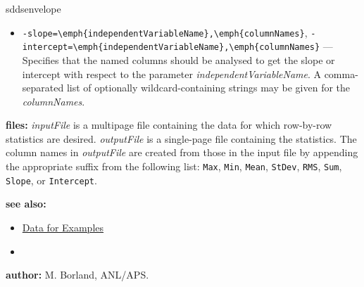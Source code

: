 \begin{sddsprog}{sddsenvelope}
\begin{itemize}
    \item \verb|-slope=\emph{independentVariableName},\emph{columnNames}|, \verb|-intercept=\emph{independentVariableName},\emph{columnNames}| --- Specifies that the named columns should be analysed to get the slope or intercept with respect to the parameter \emph{independentVariableName}. A comma-separated list of optionally wildcard-containing strings may be given for the \emph{columnNames}.
  \end{itemize}
  \item \textbf{files:} \emph{inputFile} is a multipage file containing the data for which row-by-row statistics are desired. \emph{outputFile} is a single-page file containing the statistics. The column names in \emph{outputFile} are created from those in the input file by appending the appropriate suffix from the following list: {\tt Max}, {\tt Min}, {\tt Mean}, {\tt StDev}, {\tt RMS}, {\tt Sum}, {\tt Slope}, or {\tt Intercept}.
  \item \textbf{see also:}
  \begin{itemize}
    \item \hyperref[exampleData]{Data for Examples}
    \item {}
  \end{itemize}
  \item \textbf{author:} M. Borland, ANL/APS.
\end{sddsprog}

